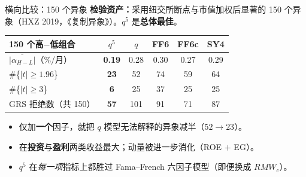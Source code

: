 \documentclass{beamer}
\begin{document}
\begin{frame}{横向比较：150 个异象}
	\textbf{检验资产：}采用纽交所断点与市值加权后显著的 150 个异象（HXZ 2019，《复制异象》）。$q^5$ 是\textbf{总体最佳}。
	\begin{center}
		\small
		\begin{tabular}{@{}lccccc@{}}
			\toprule
			150 个高$-$低组合 & $q^5$ & $q$ & FF6 & FF6c & SY4 \\
			\midrule
			$\overline{|\alpha_{H-L}|}$（\%/月） & \textbf{0.19} & 0.28 & 0.30 & 0.27 & 0.29 \\
			\#\{$|t|\ge1.96$\}                  & \textbf{23}   & 52   & 74   & 59   & 64 \\
			\#\{$|t|\ge3$\}                     & \textbf{6}    & 25   & 37   & 25   & 25 \\
			GRS 拒绝数（共 150）                 & \textbf{57}   & 101  & 91   & 71   & 87 \\
			\bottomrule
		\end{tabular}
	\end{center}
	\begin{itemize}
		\item 仅加\textbf{一个}因子，就把 $q$ 模型无法解释的异象减半（$52\to23$）。
		\item 在\textbf{投资}与\textbf{盈利}两类收益最大；动量被进一步消化（ROE $+$ EG）。
		\item $q^5$ 在\textit{每一项}指标上都胜过 Fama--French 六因子模型（即便换成 $RMW_c$）。
	\end{itemize}
\end{frame}
\end{document}

